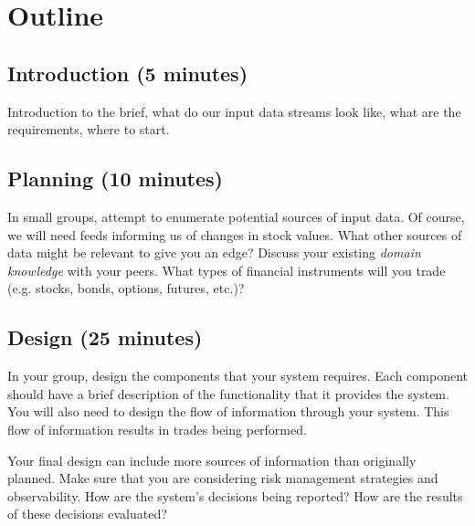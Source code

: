 \documentclass{csse4400}
\begin{document}
\section{Outline}

\subsection*{Introduction (5 minutes)}
Introduction to the brief,
what do our input data streams look like,
what are the requirements,
where to start.

\subsection*{Planning (10 minutes)}
In small groups,
attempt to enumerate potential sources of input data.
Of course,
we will need feeds informing us of changes in stock values.
What other sources of data might be relevant to give you an edge?
Discuss your existing \textsl{domain knowledge} with your peers.
What types of financial instruments will you trade (e.g. stocks, bonds, options, futures, etc.)?


\subsection*{Design (25 minutes)}

In your group,
design the components that your system requires.
Each component should have a brief description of the functionality that it provides the system.
You will also need to design the flow of information through your system.
This flow of information results in trades being performed.

Your final design can include more sources of information than originally planned.
Make sure that you are considering risk management strategies and observability.
How are the system's decisions being reported?
How are the results of these decisions evaluated?
\end{document}
